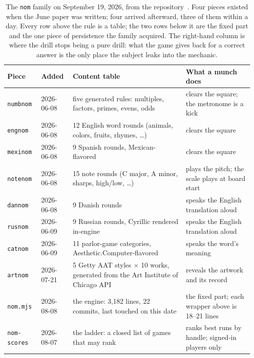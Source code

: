 \documentclass[10pt,letterpaper,twocolumn]{article}
\newcommand{\acdot}{{\color{acpink}.}}
\newcommand{\ac}{Aesthetic{\acdot}Computer}
\newcommand{\code}[1]{\texttt{#1}}
\begin{document}
\begin{table}[t]
\small
\centering
\begin{tabularx}{\textwidth}{@{}l l Y Y@{}}
\toprule
\textbf{Piece} & \textbf{Added} & \textbf{Content table} & \textbf{What a munch does} \\
\midrule
\code{numbnom} & 2026-06-08 & five generated rules: multiples, factors, primes, evens, odds & clears the square; the metronome is a kick \\
\code{engnom} & 2026-06-08 & 12 English word rounds (animals, colors, fruits, rhymes, \ldots) & clears the square \\
\code{mexinom} & 2026-06-08 & 9 Spanish rounds, Mexican-flavored & clears the square \\
\code{notenom} & 2026-06-08 & 15 note rounds (C major, A minor, sharps, high/low, \ldots) & plays the pitch; the scale plays at board start \\
\code{dannom} & 2026-06-08 & 9 Danish rounds & speaks the English translation aloud \\
\code{rusnom} & 2026-06-09 & 9 Russian rounds, Cyrillic rendered in-engine & speaks the English translation aloud \\
\code{catnom} & 2026-06-09 & 11 parlor-game categories, \ac{}-flavored & speaks the word's meaning \\
\code{artnom} & 2026-07-21 & 5 Getty AAT styles $\times$ 10 works, generated from the Art Institute of Chicago API & reveals the artwork and its record \\
\midrule
\code{nom.mjs} & 2026-08-08 & the engine: 3,182 lines, 22 commits, last touched on this date & the fixed part; each wrapper above is 18--21 lines \\
\code{nom-scores} & 2026-08-07 & the ladder: a closed list of games that may rank & ranks best runs by handle; signed-in players only \\
\bottomrule
\end{tabularx}
\caption{The \code{nom} family on September 19, 2026, from the repository~\citep{acrepo2026}. Four pieces existed when the June paper was written; four arrived afterward, three of them within a day. Every row above the rule is a table; the two rows below it are the fixed part and the one piece of persistence the family acquired. The right-hand column is where the drill stops being a pure drill: what the game gives back for a correct answer is the only place the subject leaks into the mechanic.}
\label{tab:noms}
\end{table}
\end{document}
